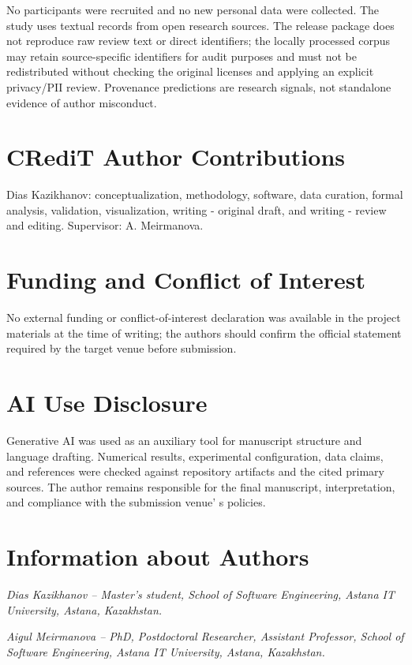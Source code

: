\documentclass[11pt,a4paper]{article}
\begin{document}
No participants were recruited and no new personal data were collected.
The study uses textual records from open research sources. The release
package does not reproduce raw review text or direct identifiers; the
locally processed corpus may retain source-specific identifiers for
audit purposes and must not be redistributed without checking the
original licenses and applying an explicit privacy/PII review.
Provenance predictions are research signals, not standalone evidence of
author misconduct.

\section*{CRediT Author Contributions}

Dias Kazikhanov: conceptualization, methodology, software, data
curation, formal analysis, validation, visualization, writing - original
draft, and writing - review and editing. Supervisor: A. Meirmanova.

\section*{Funding and Conflict of Interest}

No external funding or conflict-of-interest declaration was available in
the project materials at the time of writing; the authors should confirm
the official statement required by the target venue before submission.

\section*{AI Use Disclosure}

Generative AI was used as an auxiliary tool for manuscript structure and
language drafting. Numerical results, experimental configuration, data
claims, and references were checked against repository artifacts and the
cited primary sources. The author remains responsible for the final
manuscript, interpretation, and compliance with the submission
venue' s policies.




\section*{Information about Authors}

\emph{Dias Kazikhanov -- Master's student, School of Software
Engineering, Astana IT University, Astana, Kazakhstan.}

\emph{Aigul Meirmanova -- PhD, Postdoctoral Researcher, Assistant
Professor, School of Software Engineering, Astana IT University, Astana,
Kazakhstan.}
\end{document}
